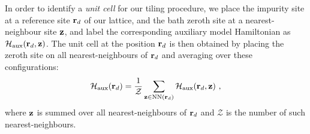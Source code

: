 \documentclass[reprint,hidelinks]{revtex4-2}
\begin{document}
In order to identify a {\it unit cell} for our tiling procedure, we place the impurity site at a reference site \({\bf r}_d\) of our lattice, and the bath zeroth site at a nearest-neighbour site \({\bf z}\), and label the corresponding auxiliary model Hamiltonian as \(\mathcal{H}_\text{aux}({\bf r}_d, {\bf z})\). The unit cell at the position \({\bf r}_d\) is then obtained by placing the zeroth site on all nearest-neighbours of \({\bf r}_d\) and averaging over these configurations:
\begin{equation}\begin{aligned}\label{unitCellHamiltonian}
	\mathcal{H}_\text{aux}({\bf r}_d) = \frac{1}{\mathcal{Z}}\sum_{{\bf z}\in\text{NN}({\bf r}_d)}\mathcal{H}_\text{aux}({\bf r}_d, {\bf z})~,
\end{aligned}\end{equation}
where \({\bf z}\) is summed over all nearest-neighbours of \({\bf r}_d\) and \(\mathcal{Z}\) is the number of such nearest-neighbours.
\end{document}
